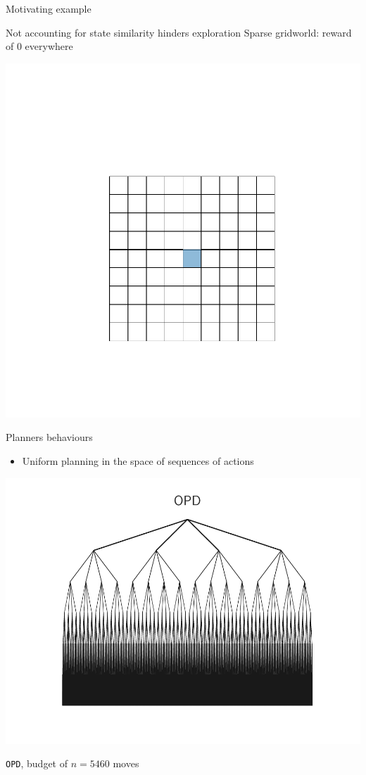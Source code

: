 \documentclass[slideopt,A4,showboxes,svgnames]{beamer}
\begin{document}
\begin{frame}{Motivating example}
\begin{alertblock}{Not accounting for state similarity hinders exploration}
	\pause
	Sparse gridworld: reward of 0 everywhere
	\begin{center}
	\includegraphics[trim={4cm 3.2cm 3.5cm 4.5cm}, clip, width=0.5\linewidth]{img/sparse_grid}	
	\end{center}
\end{alertblock}
\end{frame}

\begin{frame}{Planners behaviours}
\begin{itemize}
	\item[\incarrow] \alert{Uniform planning} in the space of sequences of actions %
\end{itemize}
\begin{center}
	\includegraphics[trim={0 1cm 0 1.5cm},clip,width=0.7\linewidth]{../img/tree_OPD}
	
	\texttt{OPD}, budget of $n=5460$ moves
\end{center}

\end{frame}
\end{document}
